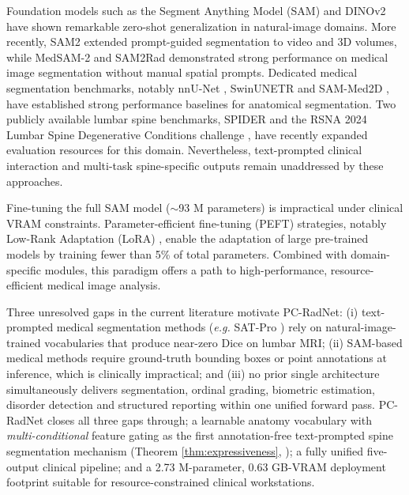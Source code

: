 \documentclass[journal]{IEEEtran}
\makeatletter
\newcommand{\modelname}{PC-RadNet}
\newcommand{\eg}{\textit{e.g.}\@\xspace}
\makeatother
\begin{document}
Foundation models such as the Segment Anything Model (SAM) \cite{kirillov2023segment} and DINOv2 \cite{oquab2024dinov2} have shown remarkable zero-shot generalization in natural-image domains. More recently, SAM2 \cite{ravi2024sam2} extended prompt-guided segmentation to video and 3D volumes, while MedSAM-2 \cite{medsam2_2024} and SAM2Rad \cite{sam2rad_2024} demonstrated strong performance on medical image segmentation without manual spatial prompts. Dedicated medical segmentation benchmarks, notably nnU-Net \cite{isensee2021nnu}, SwinUNETR \cite{hatamizadeh2022swinunetr} and SAM-Med2D \cite{cheng2023sammed2d}, have established strong performance baselines for anatomical segmentation. Two publicly available lumbar spine benchmarks, SPIDER \cite{van2024spider} and the RSNA 2024 Lumbar Spine Degenerative Conditions challenge \cite{rsna_lumbar_2026}, have recently expanded evaluation resources for this domain. Nevertheless, text-prompted clinical interaction and multi-task spine-specific outputs remain unaddressed by these approaches.

Fine-tuning the full SAM model ($\sim$93 M parameters) is impractical under clinical VRAM constraints. Parameter-efficient fine-tuning (PEFT) strategies, notably Low-Rank Adaptation (LoRA) \cite{mao2024lora_survey}, enable the adaptation of large pre-trained models by training fewer than 5\% of total parameters. Combined with domain-specific modules, this paradigm offers a path to high-performance, resource-efficient medical image analysis.

Three unresolved gaps in the current literature motivate \modelname{}:
(i) text-prompted medical segmentation methods (\eg SAT-Pro \cite{satpro2025}) rely on natural-image-trained vocabularies that produce near-zero Dice on lumbar MRI; (ii) SAM-based medical methods \cite{ma2024medsam, cheng2023sammed2d, medsam2_2024} require ground-truth bounding boxes or point annotations at inference, which is clinically impractical; and (iii) no prior single architecture simultaneously delivers segmentation, ordinal grading, biometric estimation, disorder detection and structured reporting within one unified forward pass. \modelname{} closes all three gaps through; a learnable anatomy vocabulary with \emph{multi-conditional} feature gating as the first annotation-free text-prompted spine segmentation mechanism (Theorem \ref{thm:expressiveness}, ); a fully unified five-output clinical pipeline; and a 2.73 M-parameter, 0.63 GB-VRAM deployment footprint suitable for resource-constrained clinical workstations.
\end{document}
